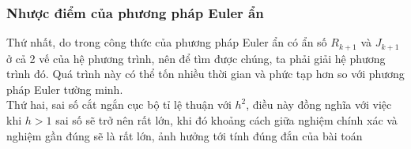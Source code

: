 \subsubsection{Nhược điểm của phương pháp Euler ẩn}
\hspace*{0.5cm} {Thứ nhất, do trong công thức của phương pháp Euler ẩn có ẩn số $R_{k+1}$ và $J_{k+1}$ ở cả 2 vế của hệ phương trình, nên để tìm được chúng, ta phải giải hệ phương trình đó. Quá trình này có thể tốn nhiều thời gian và phức tạp hơn so với phương pháp Euler tường minh.}\\
\hspace*{0.5cm} {Thứ hai, sai số cắt ngắn cục bộ tỉ lệ thuận với $h^2$, điều này đồng nghĩa với việc khi $h > 1$ sai số sẽ trở nên rất lớn, khi đó khoảng cách giữa nghiệm chính xác và nghiệm gần đúng sẽ là rất lớn, ảnh hưởng tới tính đúng đắn của bài toán}
